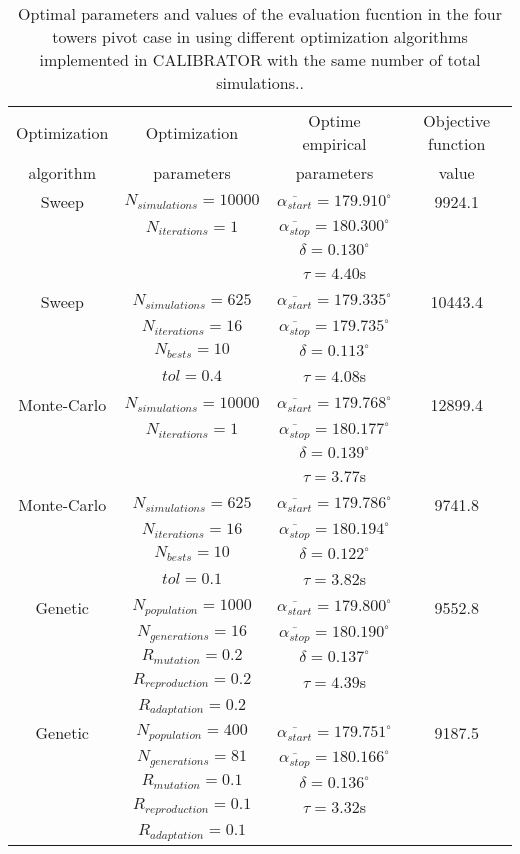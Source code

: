 \documentclass[review,authoryear]{elsarticle}
\newcommand{\TABLE}[5]
{
	\begin{table}[ht!]
		\centering
		\caption{#4.\label{#5}}
		#1
		\begin{tabular}{#2}
			#3
		\end{tabular}
	\end{table}
}
\begin{document}
\TABLE{\scriptsize}{cccc}
{
	Optimization & Optimization & Optime empirical & Objective function
	\\ algorithm & parameters & parameters & value
	\\ \hline
	Sweep & $N_{simulations}=10000$ & $\overline{\alpha_{start}}=179.910^\circ$
	& 9924.1
	\\ & $N_{iterations}=1$ & $\overline{\alpha_{stop}}=180.300^\circ$
	\\ & & $\delta=0.130^\circ$
	\\ & & $\tau=4.40$s
	\\ \hline
	Sweep & $N_{simulations}=625$ & $\overline{\alpha_{start}}=179.335^\circ$
	& 10443.4
	\\ & $N_{iterations}=16$ & $\overline{\alpha_{stop}}=179.735^\circ$
	\\ & $N_{bests}=10$ & $\delta=0.113^\circ$
	\\ & $tol=0.4$ & $\tau=4.08$s
	\\ \hline
	Monte-Carlo & $N_{simulations}=10000$
	& $\overline{\alpha_{start}}=179.768^\circ$ & 12899.4
	\\ & $N_{iterations}=1$ & $\overline{\alpha_{stop}}=180.177^\circ$
	\\ & & $\delta=0.139^\circ$
	\\ & & $\tau=3.77$s
	\\ \hline
	Monte-Carlo & $N_{simulations}=625$
	& $\overline{\alpha_{start}}=179.786^\circ$ & 9741.8
	\\ & $N_{iterations}=16$ & $\overline{\alpha_{stop}}=180.194^\circ$
	\\ & $N_{bests}=10$ & $\delta=0.122^\circ$
	\\ & $tol=0.1$ & $\tau=3.82$s
	\\ \hline
	Genetic & $N_{population}=1000$ & $\overline{\alpha_{start}}=179.800^\circ$
	& 9552.8
	\\ & $N_{generations}=16$ & $\overline{\alpha_{stop}}=180.190^\circ$
	\\ & $R_{mutation}=0.2$ & $\delta=0.137^\circ$
	\\ & $R_{reproduction}=0.2$ & $\tau=4.39$s
	\\ & $R_{adaptation}=0.2$
	\\ \hline
	Genetic & $N_{population}=400$ & $\overline{\alpha_{start}}=179.751^\circ$
	& 9187.5
	\\ & $N_{generations}=81$ & $\overline{\alpha_{stop}}=180.166^\circ$
	\\ & $R_{mutation}=0.1$ & $\delta=0.136^\circ$
	\\ & $R_{reproduction}=0.1$ & $\tau=3.32$s
	\\ & $R_{adaptation}=0.1$
	\\ \hline
}{Optimal parameters and values of the evaluation fucntion in the four towers pivot case in \citet{Ouazaa14} using different optimization algorithms implemented in CALIBRATOR with the same number of total simulations.}{TabPivot}
\end{document}
